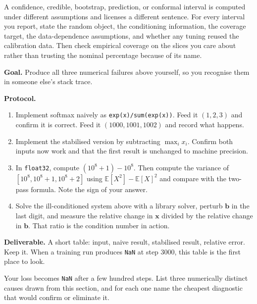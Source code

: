 \begin{cautionbox}
A confidence, credible, bootstrap, prediction, or conformal interval is
computed under different assumptions and licenses a different sentence. For
every interval you report, state the random object, the conditioning
information, the coverage target, the data-dependence assumptions, and whether
any tuning reused the calibration data. Then check empirical coverage on the
slices you care about rather than trusting the nominal percentage because of
its name.
\end{cautionbox}

\begin{practicallab}
\textbf{Goal.} Produce all three numerical failures above yourself, so you
recognise them in someone else's stack trace.

\textbf{Protocol.}
\begin{enumerate}
  \item Implement softmax naively as \texttt{exp(x)/sum(exp(x))}. Feed it
        $(1,2,3)$ and confirm it is correct. Feed it $(1000,1001,1002)$ and
        record what happens.
  \item Implement the stabilised version by subtracting $\max_i x_i$. Confirm
        both inputs now work and that the first result is unchanged to machine
        precision.
  \item In \texttt{float32}, compute $(10^8+1)-10^8$. Then compute the variance
        of $[10^8, 10^8+1, 10^8+2]$ using $\mathbb{E}[X^2]-\mathbb{E}[X]^2$ and
        compare with the two-pass formula. Note the sign of your answer.
  \item Solve the ill-conditioned system above with a library solver, perturb
        $\mathbf{b}$ in the last digit, and measure the relative change in
        $\mathbf{x}$ divided by the relative change in $\mathbf{b}$. That ratio
        is the condition number in action.
\end{enumerate}

\textbf{Deliverable.} A short table: input, naive result, stabilised result,
relative error. Keep it. When a training run produces \texttt{NaN} at step
$3000$, this table is the first place to look.
\end{practicallab}

\begin{checkpoint}
Your loss becomes \texttt{NaN} after a few hundred steps. List three
numerically distinct causes drawn from this section, and for each one name the
cheapest diagnostic that would confirm or eliminate it.
\end{checkpoint}

